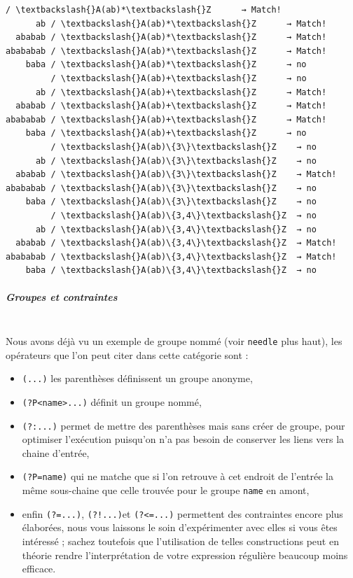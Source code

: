     \begin{Verbatim}[commandchars=\\\{\}]
         / \textbackslash{}A(ab)*\textbackslash{}Z      → Match!
      ab / \textbackslash{}A(ab)*\textbackslash{}Z      → Match!
  ababab / \textbackslash{}A(ab)*\textbackslash{}Z      → Match!
abababab / \textbackslash{}A(ab)*\textbackslash{}Z      → Match!
    baba / \textbackslash{}A(ab)*\textbackslash{}Z      → no
         / \textbackslash{}A(ab)+\textbackslash{}Z      → no
      ab / \textbackslash{}A(ab)+\textbackslash{}Z      → Match!
  ababab / \textbackslash{}A(ab)+\textbackslash{}Z      → Match!
abababab / \textbackslash{}A(ab)+\textbackslash{}Z      → Match!
    baba / \textbackslash{}A(ab)+\textbackslash{}Z      → no
         / \textbackslash{}A(ab)\{3\}\textbackslash{}Z    → no
      ab / \textbackslash{}A(ab)\{3\}\textbackslash{}Z    → no
  ababab / \textbackslash{}A(ab)\{3\}\textbackslash{}Z    → Match!
abababab / \textbackslash{}A(ab)\{3\}\textbackslash{}Z    → no
    baba / \textbackslash{}A(ab)\{3\}\textbackslash{}Z    → no
         / \textbackslash{}A(ab)\{3,4\}\textbackslash{}Z  → no
      ab / \textbackslash{}A(ab)\{3,4\}\textbackslash{}Z  → no
  ababab / \textbackslash{}A(ab)\{3,4\}\textbackslash{}Z  → Match!
abababab / \textbackslash{}A(ab)\{3,4\}\textbackslash{}Z  → Match!
    baba / \textbackslash{}A(ab)\{3,4\}\textbackslash{}Z  → no

    \end{Verbatim}

    \hypertarget{groupes-et-contraintes}{%
\subparagraph{Groupes et contraintes\\\\}\label{groupes-et-contraintes}}

    Nous avons déjà vu un exemple de groupe nommé (voir \texttt{needle} plus
haut), les opérateurs que l'on peut citer dans cette catégorie sont :
\begin{itemize}
	\item 
	\texttt{(...)} les parenthèses définissent un groupe anonyme,
	\item
	\texttt{(?P\textless{}name\textgreater{}...)} définit un groupe nommé,
	\item
	\texttt{(?:...)} permet de mettre des parenthèses mais sans créer de
	groupe, pour optimiser l'exécution puisqu'on n'a pas besoin de conserver
	les liens vers la chaine d'entrée,
	\item
	\texttt{(?P=name)} qui ne matche
	que si l'on retrouve à cet endroit de l'entrée la même sous-chaine que
	celle trouvée pour le groupe \texttt{name} en amont,
	\item
	enfin \texttt{(?=...)}, \texttt{(?!...)}et \texttt{(?\textless{}=...)}
	permettent des contraintes encore plus élaborées, nous vous laissons le
	soin d'expérimenter avec elles si vous êtes intéressé ; sachez toutefois
	que l'utilisation de telles constructions peut en théorie rendre
	l'interprétation de votre expression régulière beaucoup moins efficace.
\end{itemize}

